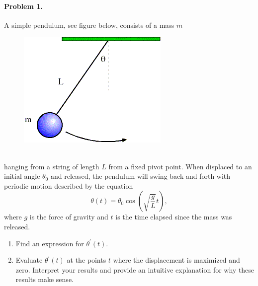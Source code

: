 \documentclass{article}
\begin{document}
\paragraph*{Problem 1.}	A simple pendulum, see figure below, consists of a mass $m$ 
\begin{figure}[h]
\centering
\includegraphics[scale=0.5]{../reviews/review1_fig1}
\end{figure}\\
hanging from a string of length $L$ from a fixed pivot point. When displaced to an initial angle $\theta_{0}$ and released, the pendulum will swing back and forth with periodic motion described by the equation
\[
\theta(t)=\theta_{0}\cos(\sqrt{\frac{g}{L}}t),
\]
where $g$ is the force of gravity and $t$ is the time elapsed since the mass was released. 
\begin{enumerate}
\item	Find an expression for $\theta^{'}(t)$.
\item	Evaluate $\theta^{'}(t)$ at the points $t$ where the displacement is maximized and zero. Interpret your results and provide an intuitive explanation for why these results make sense. 
\end{enumerate}
\end{document}
